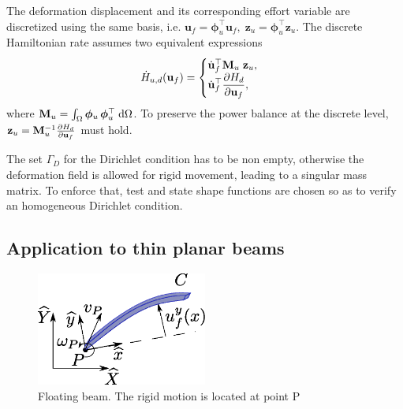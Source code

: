 \documentclass{svjour3}                     %
\begin{document}
The deformation displacement and its corresponding effort variable are discretized using the same basis, i.e. $\bm{u}_f = \bm{\phi}_u^\top \mathbf{u}_f, \; \bm{z}_u = \bm{\phi}_u^\top \mathbf{z}_u$. The discrete Hamiltonian rate assumes two equivalent expressions
\begin{equation*}
\dot{H}_{u, d}(\mathbf{u}_f) = 
\begin{cases}
\dot{\mathbf{u}}_f^\top \mathbf{M}_u \; \mathbf{z}_u, \\
\displaystyle \dot{\mathbf{u}}_f^\top \diffp{H_d}{\mathbf{u}_f},
\end{cases}
\end{equation*}
where $\mathbf{M}_u=\int_{\Omega} \bm{\phi}_u \, \bm{\phi}_u^\top \d{\Omega}$. To preserve the power balance at the discrete level, $ \mathbf{z}_u = \mathbf{M}_u^{-1} \diffp{H_d}{\mathbf{u}_f}$ must hold. \\

\begin{remark}\label{rmk:dirich}
	The set $\Gamma_D$ for the Dirichlet condition has to be non empty, otherwise the deformation field is allowed for rigid movement, leading to a singular mass matrix. To enforce that, test and state shape functions are chosen so as to verify an homogeneous Dirichlet condition. 
\end{remark}

\subsection{Application to thin planar beams}
\label{sec:ph_floatbeam}

\begin{figure}[t]
	\centering
	\includegraphics[width=0.5\textwidth]{beam.eps} 
	\caption{Floating beam. The rigid motion is located at point P}
	\label{fig:beam}
\end{figure}
\end{document}
